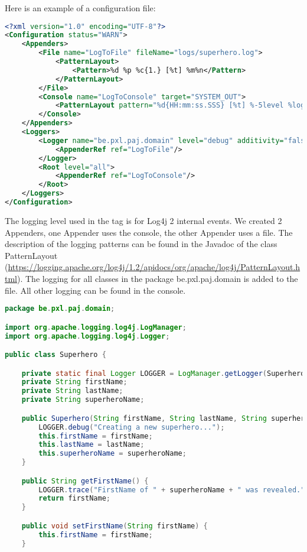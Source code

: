 \begin{} 

Here is an example of a configuration file:

\begin{lstlisting}[language=xml, frame=single]
<?xml version="1.0" encoding="UTF-8"?>
<Configuration status="WARN">
	<Appenders>
		<File name="LogToFile" fileName="logs/superhero.log">
			<PatternLayout>
				<Pattern>%d %p %c{1.} [%t] %m%n</Pattern>
			</PatternLayout>
		</File>
		<Console name="LogToConsole" target="SYSTEM_OUT">
			<PatternLayout pattern="%d{HH:mm:ss.SSS} [%t] %-5level %logger{36} - %msg%n"/>
		</Console>
	</Appenders>
	<Loggers>
		<Logger name="be.pxl.paj.domain" level="debug" additivity="false">
			<AppenderRef ref="LogToFile"/>
		</Logger>
		<Root level="all">
			<AppenderRef ref="LogToConsole"/>
		</Root>
	</Loggers>
</Configuration>
\end{lstlisting}

The logging level used in the tag  is for Log4j 2 internal events.
We created 2 Appenders, one Appender uses the console, the other Appender uses a file. 
The description of the logging patterns can be found in the Javadoc of the class PatternLayout (\url{https://logging.apache.org/log4j/1.2/apidocs/org/apache/log4j/PatternLayout.html}).
The logging for all classes in the package be.pxl.paj.domain is added to the file. All other logging can be found in the console.

\begin{lstlisting}[language=java, frame=single]
package be.pxl.paj.domain;

import org.apache.logging.log4j.LogManager;
import org.apache.logging.log4j.Logger;

public class Superhero {

	private static final Logger LOGGER = LogManager.getLogger(Superhero.class);
	private String firstName;
	private String lastName;
	private String superheroName;

	public Superhero(String firstName, String lastName, String superheroName) {
		LOGGER.debug("Creating a new superhero...");
		this.firstName = firstName;
		this.lastName = lastName;
		this.superheroName = superheroName;
	}

	public String getFirstName() {
		LOGGER.trace("FirstName of " + superheroName + " was revealed.");
		return firstName;
	}

	public void setFirstName(String firstName) {
		this.firstName = firstName;
	}


\end{lstlisting}
\end{}
